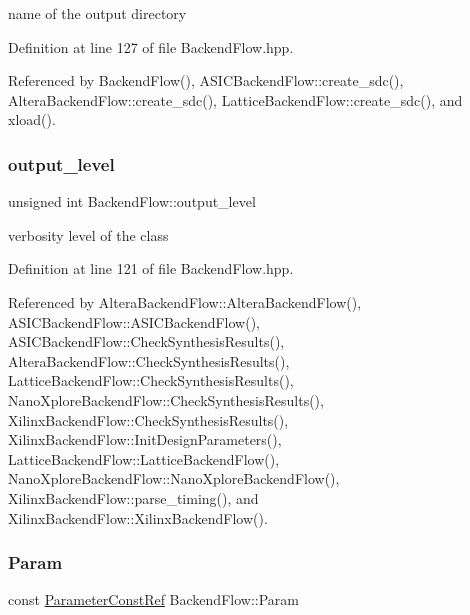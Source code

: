 name of the output directory 



Definition at line 127 of file Backend\+Flow.\+hpp.



Referenced by Backend\+Flow(), A\+S\+I\+C\+Backend\+Flow\+::create\+\_\+sdc(), Altera\+Backend\+Flow\+::create\+\_\+sdc(), Lattice\+Backend\+Flow\+::create\+\_\+sdc(), and xload().

\mbox{\label{classBackendFlow_aea3f2a1a3b65e199fe9a1752c1fd68b9}} 
\subsubsection{\texorpdfstring{output\+\_\+level}{output\_level}}
{\footnotesize\ttfamily unsigned int Backend\+Flow\+::output\+\_\+level\hspace{0.3cm}{\ttfamily [protected]}}



verbosity level of the class 



Definition at line 121 of file Backend\+Flow.\+hpp.



Referenced by Altera\+Backend\+Flow\+::\+Altera\+Backend\+Flow(), A\+S\+I\+C\+Backend\+Flow\+::\+A\+S\+I\+C\+Backend\+Flow(), A\+S\+I\+C\+Backend\+Flow\+::\+Check\+Synthesis\+Results(), Altera\+Backend\+Flow\+::\+Check\+Synthesis\+Results(), Lattice\+Backend\+Flow\+::\+Check\+Synthesis\+Results(), Nano\+Xplore\+Backend\+Flow\+::\+Check\+Synthesis\+Results(), Xilinx\+Backend\+Flow\+::\+Check\+Synthesis\+Results(), Xilinx\+Backend\+Flow\+::\+Init\+Design\+Parameters(), Lattice\+Backend\+Flow\+::\+Lattice\+Backend\+Flow(), Nano\+Xplore\+Backend\+Flow\+::\+Nano\+Xplore\+Backend\+Flow(), Xilinx\+Backend\+Flow\+::parse\+\_\+timing(), and Xilinx\+Backend\+Flow\+::\+Xilinx\+Backend\+Flow().

\mbox{\label{classBackendFlow_a7d21e7cf0afc64b13e0009c9e351873d}} 
\subsubsection{\texorpdfstring{Param}{Param}}
{\footnotesize\ttfamily const \hyperlink{Parameter_8hpp_a37841774a6fcb479b597fdf8955eb4ea}{Parameter\+Const\+Ref} Backend\+Flow\+::\+Param\hspace{0.3cm}{\ttfamily [protected]}}



